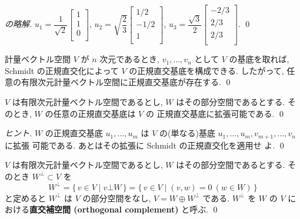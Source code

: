 \documentclass[12pt,twoside]{jarticle}
\newcommand\commentout[1]{#1}
\newcommand\commentout[1]{}
\begin{document}
\commentout{
\begin{proof}[の略解]
  $u_1=
  \dfrac{1}{\sqrt{2}}
  \begin{bmatrix}
    1 \\ 1 \\ 0 \\
  \end{bmatrix}$, 
  $u_2=
  \sqrt{\dfrac{2}{3}}
  \begin{bmatrix}
    1/2 \\ -1/2 \\ 1 \\
  \end{bmatrix}$, 
  $u_3=
  \dfrac{\sqrt{3}}{2}
  \begin{bmatrix}
    -2/3 \\ 2/3 \\ 2/3 \\
  \end{bmatrix}$.
  \qed
\end{proof}
}


\begin{rem}
  計量ベクトル空間 $V$ が $n$ 次元であるとき, 
  $v_1,\ldots,v_n$ として $V$ の基底を取れば,
  Schmidt の正規直交化によって $V$ の正規直交基底を構成できる.
  したがって, 任意の有限次元計量ベクトル空間に正規直交基底が存在する.
  \qed
\end{rem}


\begin{question}
  $V$ は有限次元計量ベクトル空間であるとし, $W$ はその部分空間であるとする.
  そのとき, $W$ の任意の正規直交基底は $V$ の
  正規直交基底に拡張可能である.
  \qed
\end{question}

\begin{proof}[ヒント]
  $W$ の正規直交基底 $u_1,\ldots,u_m$ 
  は $V$ の(単なる)基底 $u_1,\ldots,u_m,v_{m+1},\ldots,v_n$ に拡張
  可能である. あとはその拡張に Schmidt の正規直交化を適用せ
  よ.
  \qed
\end{proof}


\begin{question}[直交補空間]
  \label{q:orthogonal-complement}
  $V$ は有限次元計量ベクトル空間であるとし, $W$ はその部分空間であるとする.
  そのとき $W^\bot\subset V$ を
  \begin{equation*}
    W^\bot 
    = \{\, v\in V\mid v\bot W \,\}
    = \{\, v\in V\mid (v,w)=0 \ (w\in W)\,\}
  \end{equation*}
  と定めると $W^\bot$ は $V$ の部分空間をなし, $V=W\oplus W^\bot$ である.
  $W^\bot$ を $W$ の $V$ における{\bf 直交補空間 (orthogonal complement)}
  と呼ぶ.
  \qed
\end{question}
\end{document}
